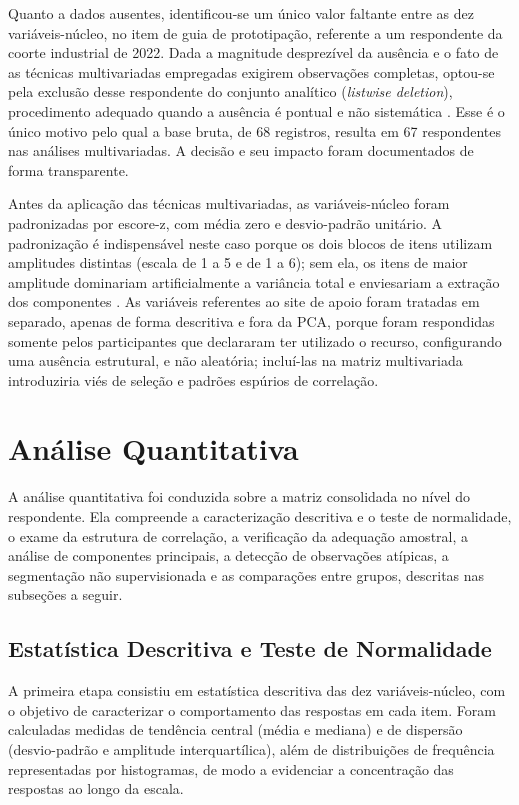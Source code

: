 Quanto a dados ausentes, identificou-se um único valor faltante entre as dez variáveis-núcleo, no item de guia de prototipação, referente a um respondente da coorte industrial de 2022. Dada a magnitude desprezível da ausência e o fato de as técnicas multivariadas empregadas exigirem observações completas, optou-se pela exclusão desse respondente do conjunto analítico (\textit{listwise deletion}), procedimento adequado quando a ausência é pontual e não sistemática \cite{hair2019}. Esse é o único motivo pelo qual a base bruta, de 68 registros, resulta em 67 respondentes nas análises multivariadas. A decisão e seu impacto foram documentados de forma transparente.

Antes da aplicação das técnicas multivariadas, as variáveis-núcleo foram padronizadas por escore-z, com média zero e desvio-padrão unitário. A padronização é indispensável neste caso porque os dois blocos de itens utilizam amplitudes distintas (escala de 1 a 5 e de 1 a 6); sem ela, os itens de maior amplitude dominariam artificialmente a variância total e enviesariam a extração dos componentes \cite{hair2019}. As variáveis referentes ao site de apoio foram tratadas em separado, apenas de forma descritiva e fora da PCA, porque foram respondidas somente pelos participantes que declararam ter utilizado o recurso, configurando uma ausência estrutural, e não aleatória; incluí-las na matriz multivariada introduziria viés de seleção e padrões espúrios de correlação.

\section{Análise Quantitativa}
\label{sec:quantitativa}

A análise quantitativa foi conduzida sobre a matriz consolidada no nível do respondente. Ela compreende a caracterização descritiva e o teste de normalidade, o exame da estrutura de correlação, a verificação da adequação amostral, a análise de componentes principais, a detecção de observações atípicas, a segmentação não supervisionada e as comparações entre grupos, descritas nas subseções a seguir.

\subsection{Estatística Descritiva e Teste de Normalidade}
\label{sec:descritiva}

A primeira etapa consistiu em estatística descritiva das dez variáveis-núcleo, com o objetivo de caracterizar o comportamento das respostas em cada item. Foram calculadas medidas de tendência central (média e mediana) e de dispersão (desvio-padrão e amplitude interquartílica), além de distribuições de frequência representadas por histogramas, de modo a evidenciar a concentração das respostas ao longo da escala.

